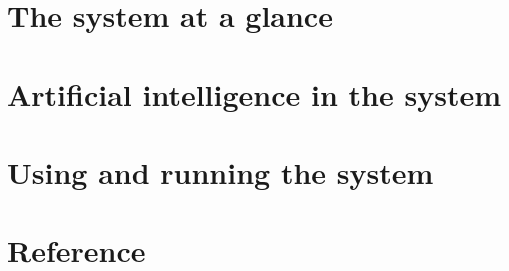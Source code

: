 \documentclass[a4paper, fontsize=10.5pt, DIV=calc, parskip=half-, oneside, open=any,
               numbers=noenddot, headings=normal, toc=chapterentrydotfill,
               listof=totoc, bibliography=totoc]{scrreprt}
\newif\ifwhole \wholetrue
\newcommand{\docpart}[1]{\ifwhole\part{#1}\fi}
\begin{document}
\ifwhole
  
  
  \tableofcontents
\fi


\docpart{The system at a glance}





\docpart{Artificial intelligence in the system}












\docpart{Using and running the system}








\appendix
\docpart{Reference}





\end{document}
